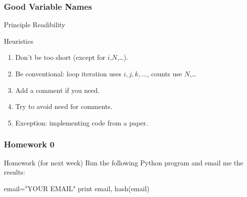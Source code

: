 \begin{frame}[fragile]
\frametitle{Good Variable Names}
\begin{block}{Principle}
Readibility
\end{block}
\begin{block}{Heuristics}
\begin{enumerate}
\item Don't be too short (except for $i$,$N$,\ldots).
\item Be conventional: loop iteration uses $i,j,k,\dots$, counts use $N$,\ldots
\item Add a comment if you need.
\item Try to avoid need for comments.
\item Exception: implementing code from a paper.
\end{enumerate}
\end{block}

\end{frame}

\begin{frame}[fragile]
\frametitle{Homework 0}

\begin{block}{Homework (for next week)}
Run the following Python program and email me the results:
\begin{python}
email="YOUR EMAIL"
print email, hash(email)
\end{python}
\end{block}
\end{frame}


